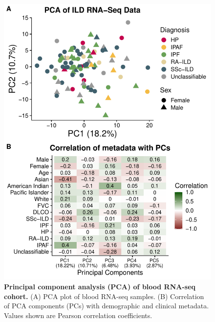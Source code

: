 \documentclass[
]{article}
\begin{document}
\begin{figure}

{\centering \includegraphics[width=0.7\linewidth,]{./Figures/BloodRNAseq/bloodRNAseq_pca_v2} 

}

\caption[Correlation of PCs with metadata (blood RNA-seq)]{\textbf{Principal component analysis (PCA) of blood RNA-seq cohort.} (A) PCA plot of blood RNA-seq samples. (B) Correlation of PCA components (PCs) with demographic and clinical metadata. Values shown are Pearson correlation coefficients.}\label{fig:rnaseqPCA}
\end{figure}
\end{document}
